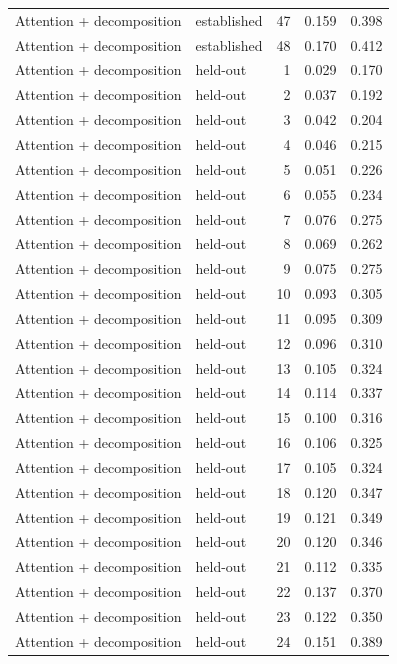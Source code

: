 \begin{tabular}{llrrr}
Attention + decomposition & established & 47 & 0.159 & 0.398 \\
Attention + decomposition & established & 48 & 0.170 & 0.412 \\
Attention + decomposition & held-out & 1 & 0.029 & 0.170 \\
Attention + decomposition & held-out & 2 & 0.037 & 0.192 \\
Attention + decomposition & held-out & 3 & 0.042 & 0.204 \\
Attention + decomposition & held-out & 4 & 0.046 & 0.215 \\
Attention + decomposition & held-out & 5 & 0.051 & 0.226 \\
Attention + decomposition & held-out & 6 & 0.055 & 0.234 \\
Attention + decomposition & held-out & 7 & 0.076 & 0.275 \\
Attention + decomposition & held-out & 8 & 0.069 & 0.262 \\
Attention + decomposition & held-out & 9 & 0.075 & 0.275 \\
Attention + decomposition & held-out & 10 & 0.093 & 0.305 \\
Attention + decomposition & held-out & 11 & 0.095 & 0.309 \\
Attention + decomposition & held-out & 12 & 0.096 & 0.310 \\
Attention + decomposition & held-out & 13 & 0.105 & 0.324 \\
Attention + decomposition & held-out & 14 & 0.114 & 0.337 \\
Attention + decomposition & held-out & 15 & 0.100 & 0.316 \\
Attention + decomposition & held-out & 16 & 0.106 & 0.325 \\
Attention + decomposition & held-out & 17 & 0.105 & 0.324 \\
Attention + decomposition & held-out & 18 & 0.120 & 0.347 \\
Attention + decomposition & held-out & 19 & 0.121 & 0.349 \\
Attention + decomposition & held-out & 20 & 0.120 & 0.346 \\
Attention + decomposition & held-out & 21 & 0.112 & 0.335 \\
Attention + decomposition & held-out & 22 & 0.137 & 0.370 \\
Attention + decomposition & held-out & 23 & 0.122 & 0.350 \\
Attention + decomposition & held-out & 24 & 0.151 & 0.389 \\

\end{tabular}
